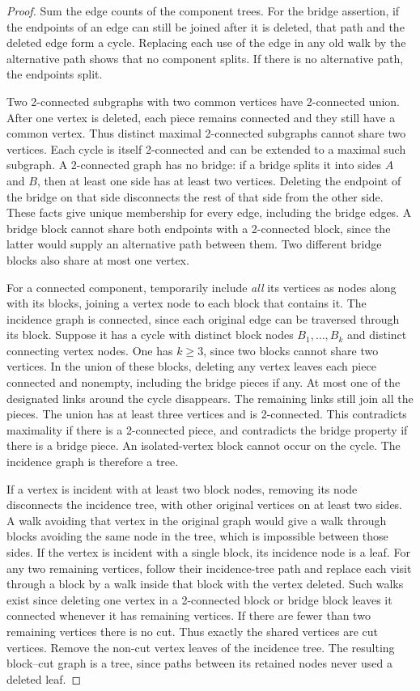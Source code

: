 \documentclass[11pt,oneside,openany]{book}
\theoremstyle{plain}
\theoremstyle{definition}
\theoremstyle{remark}
\begin{document}
\begin{proof}
Sum the edge counts of the component trees. For the bridge assertion,
if the endpoints of an edge can still be joined after it is deleted,
that path and the deleted edge form a cycle. Replacing each use of the
edge in any old walk by the alternative path shows that no component
splits. If there is no alternative path, the endpoints split.

Two 2-connected subgraphs with two common vertices have 2-connected
union. After one vertex is deleted, each piece remains connected and
they still have a common vertex. Thus distinct maximal 2-connected
subgraphs cannot share two vertices. Each cycle is itself 2-connected
and can be extended to a maximal such subgraph. A 2-connected graph
has no bridge: if a bridge splits it into sides \(A\) and \(B\), then
at least one side has at least two vertices. Deleting the endpoint
of the bridge on that side disconnects the rest of that side from the
other side. These facts give unique membership for every edge, including
the bridge edges. A bridge block cannot share both endpoints with a
2-connected block, since the latter would supply an alternative path
between them. Two different bridge blocks also share at most one
vertex.

For a connected component, temporarily include \emph{all} its vertices
as nodes along with its blocks, joining a vertex node to each block
that contains it. The incidence graph is connected, since each original
edge can be traversed through its block. Suppose it has a cycle with
distinct block nodes \(B_1,\ldots,B_k\) and distinct connecting vertex
nodes. One has \(k\geq 3\), since two blocks cannot share two vertices.
In the union of these blocks, deleting any vertex leaves each piece
connected and nonempty, including the bridge pieces if any. At most
one of the designated links around the cycle disappears. The remaining
links still join all the pieces. The union has at least three vertices
and is 2-connected. This contradicts maximality if there is a
2-connected piece, and contradicts the bridge property if there is a
bridge piece. An isolated-vertex block cannot occur on the cycle.
The incidence graph is therefore a tree.

If a vertex is incident with at least two block nodes, removing its
node disconnects the incidence tree, with other original vertices on
at least two sides. A walk avoiding that vertex in the original graph
would give a walk through blocks avoiding the same node in the tree,
which is impossible between those sides. If the vertex is incident with
a single block, its incidence node is a leaf. For any two remaining
vertices, follow their incidence-tree path and replace each visit
through a block by a walk inside that block with the vertex deleted.
Such walks exist since deleting one vertex in a 2-connected block or
bridge block leaves it connected whenever it has remaining vertices.
If there are fewer than two remaining vertices there is no cut.
Thus exactly the shared vertices are cut vertices. Remove the
non-cut vertex leaves of the incidence tree. The resulting block--cut
graph is a tree, since paths between its retained nodes never used a
deleted leaf.
\end{proof}
\end{document}
